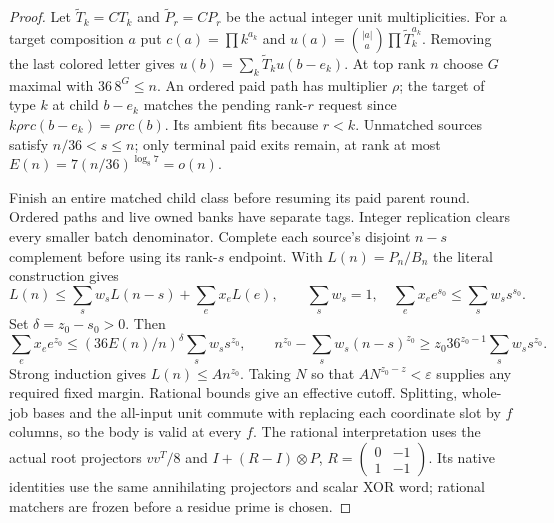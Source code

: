 \documentclass[11pt]{article}
\begin{document}
\begin{proof}
Let $\widetilde T_k=CT_k$ and $\widetilde P_r=CP_r$ be the actual
integer unit multiplicities. For a target composition $a$ put
$c(a)=\prod k^{a_k}$ and
$u(a)=\binom{|a|}{a}\prod\widetilde T_k^{a_k}$. Removing the last
colored letter gives $u(b)=\sum_k\widetilde T_ku(b-e_k)$.
At top rank $n$ choose $G$ maximal
with $36\,8^G\le n$. An ordered paid path has multiplier $\rho$; the
target of type $k$ at child $b-e_k$ matches the pending rank-$r$ request
since $k\rho r c(b-e_k)=\rho r c(b)$. Its ambient fits because $r<k$.
Unmatched sources satisfy $n/36<s\le n$; only terminal paid exits
remain, at rank at most $E(n)=7(n/36)^{\log_8 7}=o(n)$.

Finish an entire matched child class before resuming its paid parent
round. Ordered paths and live owned banks have separate tags. Integer
replication clears every smaller batch denominator. Complete each
source's disjoint $n-s$ complement before using its rank-$s$ endpoint.
With $L(n)=P_n/B_n$ the literal construction gives
\[L(n)\le\sum_sw_sL(n-s)+\sum_ex_eL(e),\qquad
\sum_sw_s=1,\quad \sum_ex_ee^{s_0}\le\sum_sw_ss^{s_0}.\]
Set $\delta=z_0-s_0>0$. Then
\[\sum_ex_ee^{z_0}\le(36E(n)/n)^\delta\sum_sw_ss^{z_0},\qquad
n^{z_0}-\sum_sw_s(n-s)^{z_0}\ge z_0 36^{z_0-1}\sum_sw_ss^{z_0}.\]
Strong induction gives $L(n)\le A n^{z_0}$. Taking $N$ so that
$A N^{z_0-z}<\varepsilon$ supplies any required fixed margin.
Rational bounds give an effective cutoff. Splitting, whole-job
bases and the all-input unit commute with replacing each coordinate
slot by $f$ columns, so the body is valid at every $f$.
The rational interpretation uses the actual root projectors $vv^T/8$
and $I+(R-I)\otimes P$, $R=\left(\begin{smallmatrix}0&-1\\1&-1\end{smallmatrix}\right)$.
Its native identities use the same annihilating projectors and scalar
XOR word; rational matchers are frozen before a residue prime is chosen.
\end{proof}
\end{document}
